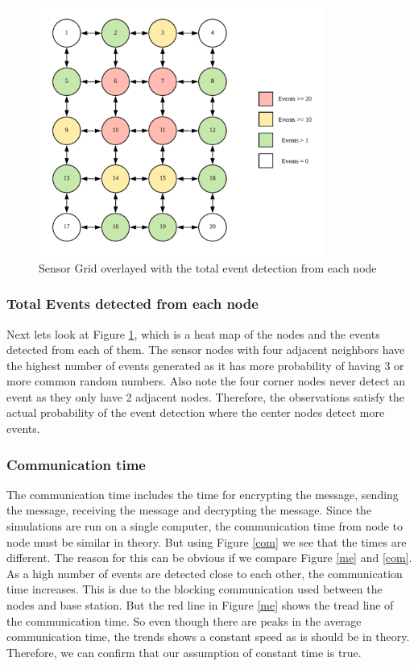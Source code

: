 \documentclass[conference]{IEEEtran}
\begin{document}
	 \begin{figure}[!h]
	 	\centering
	 	\includegraphics[width=3.7in,keepaspectratio]{gridsum}
	 	\caption{Sensor Grid overlayed with the total event detection from each node}
	 	\label{colgrid}
	 \end{figure}
 
	\subsubsection{Total Events detected from each node}
	Next lets look at Figure \ref{colgrid}, which is a heat map of the nodes and the events detected from each of them. The sensor nodes with four adjacent neighbors have the highest number of events generated as it has more probability of having 3 or more common random numbers. Also note the four corner nodes never detect an event as they only have 2 adjacent nodes. Therefore, the observations satisfy the actual probability of the event detection where the center nodes detect more events.
	
	\subsubsection{Communication time}
	
	The communication time includes the time for encrypting the message, sending the message, receiving the message and decrypting the message. Since the simulations are run on a single computer, the communication time from node to node must be similar in theory. But using Figure \ref{com} we see that the times are different. The reason for this can be obvious if we compare Figure \ref{me} and \ref{com}. As a high number of events  are detected close to each other, the communication time increases. This is due to the blocking communication used between the nodes and base station. But the red line in Figure \ref{me} shows the tread line of the communication time. So even though there are peaks in the average communication time, the trends shows a constant speed as is should be in theory. Therefore, we can confirm that our assumption of constant time is true.
	
\end{document}
